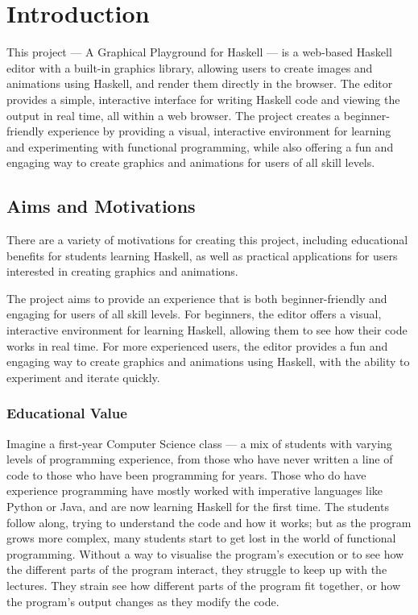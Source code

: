\documentclass[../main.tex]{subfiles}
\begin{document}
\chapter{Introduction} \label{ch:introduction}
    This project — A Graphical Playground for Haskell — is a web-based Haskell
        editor with a built-in graphics library, allowing users to create images and
        animations using Haskell, and render them directly in the browser.
    The editor provides a simple, interactive interface for writing Haskell code
        and viewing the output in real time, all within a web browser.
    The project creates a beginner-friendly experience by providing a visual,
        interactive environment for learning and experimenting with functional
        programming, while also offering a fun and engaging way to create graphics and
        animations for users of all skill levels.

    \section{Aims and Motivations}
        There are a variety of motivations for creating this project, including
            educational benefits for students learning Haskell, as well as practical
            applications for users interested in creating graphics and animations.

        The project aims to provide an experience that is both beginner-friendly and
            engaging for users of all skill levels.
        For beginners, the editor offers a visual, interactive environment for learning
            Haskell, allowing them to see how their code works in real time.
        For more experienced users, the editor provides a fun and engaging way to
            create graphics and animations using Haskell, with the ability to experiment
            and iterate quickly.

        \subsection{Educational Value}
            Imagine a first-year Computer Science class — a mix of students with varying
                levels of programming experience, from those who have never written a line of
                code to those who have been programming for years.
            Those who do have experience programming have mostly worked with imperative
                languages like Python or Java, and are now learning Haskell for the first time.
            The students follow along, trying to understand the code and how it works; but
                as the program grows more complex, many students start to get lost in the world
                of functional programming.
            Without a way to visualise the program's execution or to see how the different
                parts of the program interact, they struggle to keep up with the lectures.
            They strain see how different parts of the program fit together, or how the
                program's output changes as they modify the code.
\end{document}
